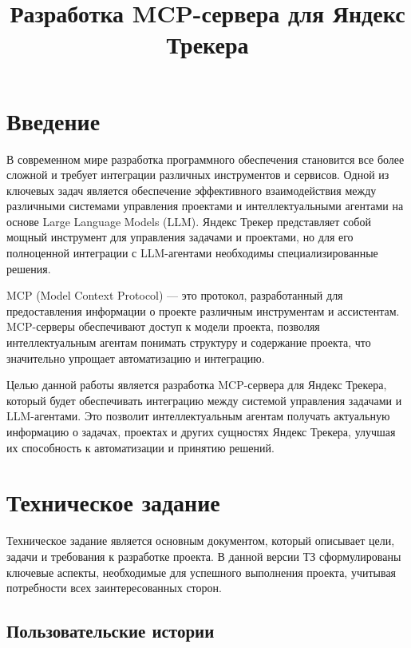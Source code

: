 \documentclass[utf8, russian]{eskdtext}
\title{{\small Разработка MCP-сервера для Яндекс Трекера}}
\let\stdsection\section
\renewcommand \section{\newpage\stdsection}
\begin{document}
\maketitle
\tableofcontents
\section*{Введение}

В современном мире разработка программного обеспечения становится все более сложной и требует интеграции различных инструментов и сервисов. Одной из ключевых задач является обеспечение эффективного взаимодействия между различными системами управления проектами и интеллектуальными агентами на основе Large Language Models (LLM). Яндекс Трекер представляет собой мощный инструмент для управления задачами и проектами, но для его полноценной интеграции с LLM-агентами необходимы специализированные решения.

MCP (Model Context Protocol) — это протокол, разработанный для предоставления информации о проекте различным инструментам и ассистентам. MCP-серверы обеспечивают доступ к модели проекта, позволяя интеллектуальным агентам понимать структуру и содержание проекта, что значительно упрощает автоматизацию и интеграцию.

Целью данной работы является разработка MCP-сервера для Яндекс Трекера, который будет обеспечивать интеграцию между системой управления задачами и LLM-агентами. Это позволит интеллектуальным агентам получать актуальную информацию о задачах, проектах и других сущностях Яндекс Трекера, улучшая их способность к автоматизации и принятию решений.

\newpage

\section{Техническое задание}
Техническое задание является основным документом, который описывает цели, задачи и требования к разработке проекта. В данной версии ТЗ  сформулированы ключевые аспекты, необходимые для успешного выполнения проекта, учитывая потребности всех заинтересованных сторон.

\subsection{Пользовательские истории}
\end{document}
